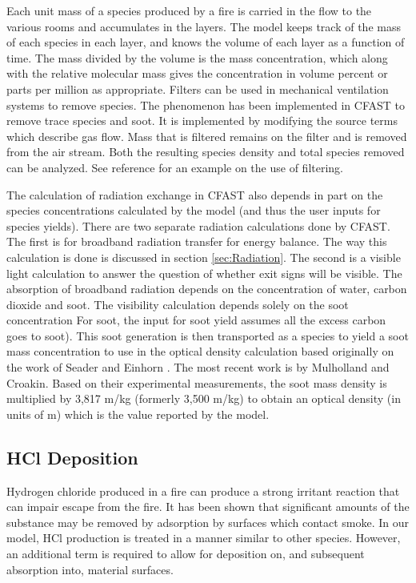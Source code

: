 Each unit mass of a species produced by a fire is carried in the flow to the various rooms and accumulates in the layers.  The model keeps track of the mass of each species in each layer, and knows the volume of each layer as a function of time.  The mass divided by the volume is the mass concentration, which along with the relative molecular mass gives the concentration in volume percent or parts per million as appropriate. Filters can be used in mechanical ventilation systems to remove species. The phenomenon has been implemented in CFAST to remove trace species and soot. It is implemented by modifying the source terms which describe gas flow. Mass that is filtered remains on the filter and is removed from the air stream. Both the resulting species density and total species removed can be analyzed. See reference \cite{Jones:2008} for an example on the use of filtering.

The calculation of radiation exchange in CFAST also depends in part on the species concentrations calculated by the model (and thus the user inputs for species yields). There are two separate radiation calculations done by CFAST. The first is for broadband radiation transfer for energy balance. The way this calculation is done is discussed in section \ref{sec:Radiation}. The second is a visible light calculation to answer the question of whether exit signs will be visible. The absorption of broadband radiation depends on the concentration of water, carbon dioxide and soot. The visibility calculation depends solely on the soot concentration For soot, the input for soot yield  assumes all the excess carbon goes to soot). This soot generation is then transported as a species to yield a soot mass concentration to use in the optical density calculation based originally on the work of Seader and Einhorn \cite{Seader:1976}. The most recent work is by Mulholland and Croakin\cite{Mullholland:2000}. Based on their experimental measurements, the soot mass density is multiplied by 3,817 m/kg (formerly 3,500 m/kg) to obtain an optical density (in units of m) which is the value reported by the model.

\subsection{HCl Deposition}\label{HClDeposition}

Hydrogen chloride produced in a fire can produce a strong irritant reaction that can impair escape from the fire.  It has been shown \cite{Galloway:1989} that significant amounts of the substance may be removed by adsorption by surfaces which contact smoke.  In our model, HCl production is treated in a manner similar to other species.  However, an additional term is required to allow for deposition on, and subsequent absorption into, material surfaces.


